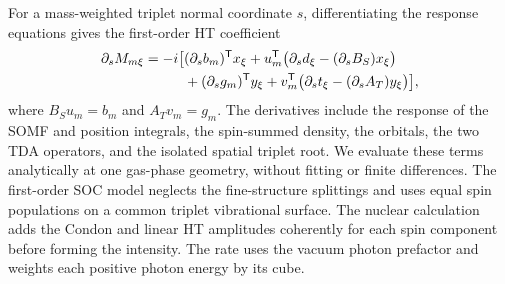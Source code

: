For a mass-weighted triplet normal coordinate $s$, differentiating the
response equations gives the first-order HT coefficient
\begin{align}
 \partial_s M_{m\xi}=-i\bigl[&
 (\partial_s b_m)^{\mathsf T}x_\xi
 +u_m^{\mathsf T}\bigl(\partial_s d_\xi-(\partial_s B_S)x_\xi\bigr)
 \notag\\
 &+(\partial_s g_m)^{\mathsf T}y_\xi
 +v_m^{\mathsf T}\bigl(\partial_s t_\xi-(\partial_s A_T)y_\xi\bigr)
 \bigr],
 \label{eq:soc-ht}
\end{align}
where $B_S u_m=b_m$ and $A_T v_m=g_m$. The derivatives include the
response of the SOMF and position integrals, the spin-summed density,
the orbitals, the two TDA operators, and the isolated spatial triplet
root.\cite{pygraso} We evaluate these terms analytically at one gas-phase
geometry, without fitting or finite differences. The first-order SOC
model neglects the fine-structure splittings and uses equal spin
populations on a common triplet vibrational surface. The nuclear
calculation adds the Condon and linear HT amplitudes coherently for each
spin component before forming the intensity. The rate uses the vacuum
photon prefactor and weights each positive photon energy by its cube.
